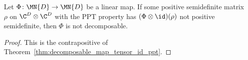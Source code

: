 \begin{theorem}
    \label{thm:indecomposable_of_ppt_witness}
    \leanok
    Let $\Phi\colon\MN{D}\to\MN{D}$ be a linear map. If some positive
    semidefinite matrix $\rho$ on $\C^{D}\otimes\C^{D}$ with the PPT property
    has $(\Phi\otimes\id)(\rho)$ not positive semidefinite, then $\Phi$ is not
    decomposable.
\end{theorem}

\begin{proof}
    \leanok
    This is the contrapositive of
    Theorem~\ref{thm:decomposable_map_tensor_id_ppt}.
\end{proof}
